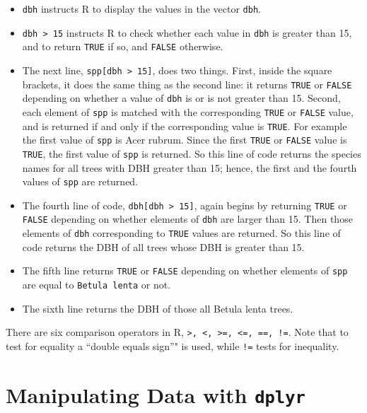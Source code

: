 \documentclass[]{krantz}
\providecommand{\tightlist}{%
  \setlength{\itemsep}{0pt}\setlength{\parskip}{0pt}}
\theoremstyle{definition}
\theoremstyle{definition}
\theoremstyle{definition}
\theoremstyle{remark}
\begin{document}
\begin{itemize}
\tightlist
\item
  \texttt{dbh} instructs R to display the values in the vector
  \texttt{dbh}.
\item
  \texttt{dbh\ \textgreater{}\ 15} instructs R to check whether each
  value in \texttt{dbh} is greater than 15, and to return \texttt{TRUE}
  if so, and \texttt{FALSE} otherwise.
\item
  The next line, \texttt{spp{[}dbh\ \textgreater{}\ 15{]}}, does two
  things. First, inside the square brackets, it does the same thing as
  the second line: it returns \texttt{TRUE} or \texttt{FALSE} depending
  on whether a value of \texttt{dbh} is or is not greater than 15.
  Second, each element of \texttt{spp} is matched with the corresponding
  \texttt{TRUE} or \texttt{FALSE} value, and is returned if and only if
  the corresponding value is \texttt{TRUE}. For example the first value
  of \texttt{spp} is Acer rubrum. Since the first \texttt{TRUE} or
  \texttt{FALSE} value is \texttt{TRUE}, the first value of \texttt{spp}
  is returned. So this line of code returns the species names for all
  trees with DBH greater than 15; hence, the first and the fourth values
  of \texttt{spp} are returned.
\item
  The fourth line of code, \texttt{dbh{[}dbh\ \textgreater{}\ 15{]}},
  again begins by returning \texttt{TRUE} or \texttt{FALSE} depending on
  whether elements of \texttt{dbh} are larger than 15. Then those
  elements of \texttt{dbh} corresponding to \texttt{TRUE} values are
  returned. So this line of code returns the DBH of all trees whose DBH
  is greater than 15.
\item
  The fifth line returns \texttt{TRUE} or \texttt{FALSE} depending on
  whether elements of \texttt{spp} are equal to \texttt{Betula\ lenta}
  or not.
\item
  The sixth line returns the DBH of those all Betula lenta trees.
\end{itemize}

There are six comparison operators in R,
\texttt{\textgreater{},\ \textless{},\ \textgreater{}=,\ \textless{}=,\ ==,\ !=}.
Note that to test for equality a ``double equals sign''" is used, while
\texttt{!=} tests for inequality.

\chapter{\texorpdfstring{Manipulating Data with
\texttt{dplyr}}{Manipulating Data with dplyr}}\label{manipulating-data-with-dplyr}
\end{document}
